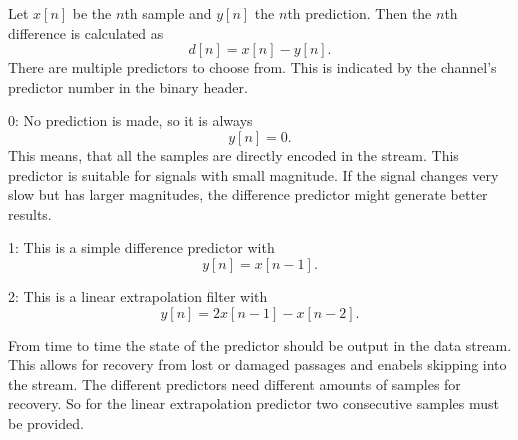 \documentclass[DIV=10]{scrartcl}
\begin{document}
Let \(x[n]\) be the \(n\)th sample and \(y[n]\) the \(n\)th prediction.
Then the \(n\)th difference is calculated as
\[
  d[n] = x[n] - y[n].
\]
There are multiple predictors to choose from.
This is indicated by the channel’s predictor number in the binary header.

0: No prediction is made, so it is always
\[
  y[n] = 0.
\]
This means, that all the samples are directly encoded in the stream.
This predictor is suitable for signals with small magnitude.
If the signal changes very slow but has larger magnitudes, the difference predictor might generate better results.

1: This is a simple difference predictor with
\[
  y[n] = x[n - 1].
\]

2: This is a linear extrapolation filter with
\[
  y[n] = 2x[n - 1] - x[n - 2].
\]

From time to time the state of the predictor should be output in the data stream.
This allows for recovery from lost or damaged passages and enabels skipping into the stream.
The different predictors need different amounts of samples for recovery.
So for the linear extrapolation predictor two consecutive samples must be provided.
\end{document}
